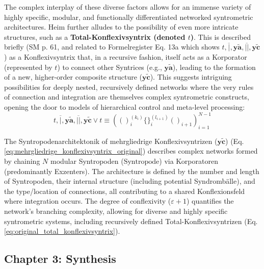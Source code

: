 \documentclass[12pt]{article}
\newcommand{\syntrix}{\bm{y\widetilde{a}}}
\newcommand{\konflexivsyntrix}{\bm{y\widetilde{c}}}
\newcommand{\syntropode}{\text{Syntropode}}
\begin{document}
\begin{itemize}
\begin{enumerate}
    \end{enumerate}
    The complex interplay of these diverse factors allows for an immense variety of highly specific, modular, and functionally differentiated networked syntrometric architectures. Heim further alludes to the possibility of even more intricate structures, such as a \textbf{Total-Konflexivsyntrix (denoted \( t \))}. This is described briefly (SM p. 61, and related to Formelregister Eq. 13a which shows \( t, \overline{|}, \syntrix, \overline{||}, \konflexivsyntrix \)) as a Konflexivsyntrix that, in a recursive fashion, itself acts as a Korporator (represented by \( t \)) to connect other Syntrices (e.g., \( \syntrix \)), leading to the formation of a new, higher-order composite structure (\( \konflexivsyntrix \)). This suggests intriguing possibilities for deeply nested, recursively defined networks where the very rules of connection and integration are themselves complex syntrometric constructs, opening the door to models of hierarchical control and meta-level processing:
    \begin{equation}
    t, \overline{|}, \syntrix, \overline{||}, \konflexivsyntrix \vee t \equiv \left( ( )_i^{(k_i)} \{ \}_i^{(l_{i+1})} ( )_{i+1} \right)_{i=1}^{N-1}
    \label{eq:original_total_konflexivsyntrix}
    \end{equation}
\end{itemize}

The Syntropodenarchitektonik of mehrgliedrige Konflexivsyntrizen (\(\konflexivsyntrix\)) (Eq. \eqref{eq:mehrgliedrige_konflexivsyntrix_original}) describes complex networks formed by chaining \(N\) modular Syntropoden (\(\syntropode\)) via Korporatoren (predominantly Exzenters). The architecture is defined by the number and length of Syntropoden, their internal structure (including potential Syndrombälle), and the type/location of connections, all contributing to a shared Konflexionsfeld where integration occurs. The degree of conflexivity (\(\varepsilon+1\)) quantifies the network's branching complexity, allowing for diverse and highly specific syntrometric systems, including recursively defined Total-Konflexivsyntrizen (Eq. \eqref{eq:original_total_konflexivsyntrix}).

\subsection{Chapter 3: Synthesis}
\label{sec:chapter3_synthesis}
\end{document}
